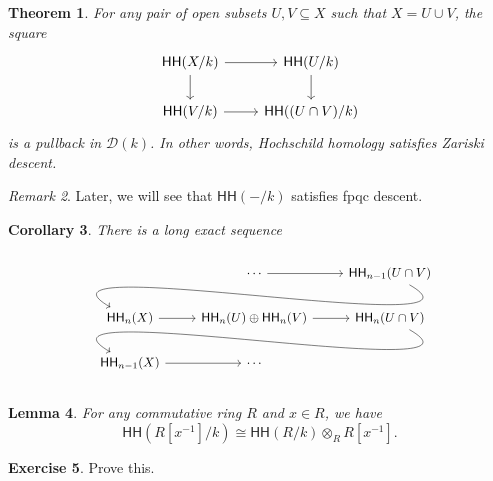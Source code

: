 \documentclass[10pt]{amsart}
\newtheorem{thm}{Theorem}[subsection]
\newtheorem{cor}[thm]{Corollary}
\newtheorem{lem}[thm]{Lemma}
\theoremstyle{definition}
\newtheorem{exer}[thm]{Exercise}
\theoremstyle{remark}
\newtheorem{rmk}[thm]{Remark}
\theoremstyle{plain}
\theoremstyle{definition}
\theoremstyle{remark}
\newcommand{\mc}[1]{\mathcal{#1}}
\newcommand{\ms}[1]{\mathsf{#1}}
\newcommand{\1}{\mathbf{1}}
\newcommand{\2}{\mathbf{2}}
\newcommand{\3}{\mathbf{3}}
\newcommand{\HH}{\ms{HH}}
\begin{document}
\begin{thm}\label{thm:zariskidescent}
    For any pair of open subsets $U, V \subseteq X$ such that $X = U \cup V$, the square
    \begin{equation*}
    \begin{tikzcd}
        \HH(X/k) \ar{r} \ar{d} & \HH(U/k) \ar{d} \\
        \HH(V/k) \ar{r} & \HH((U \cap V)/k)
    \end{tikzcd}
    \end{equation*}
    is a pullback in $\mc{D}(k)$. In other words, Hochschild homology satisfies Zariski descent.
\end{thm}

\begin{rmk}
    Later, we will see that $\HH(-/k)$ satisfies fpqc descent.
\end{rmk}

\begin{cor}
    There is a long exact sequence
    \begin{equation*}
        \begin{tikzcd}
            & \cdots \ar{r} & \HH_{n-1}(U \cap V) \arrow[out=-30, in=150]{dll} \\
            \HH_{n}(X) \ar{r} & \HH_n(U) \oplus \HH_n(V) \ar{r} & \HH_n(U \cap V) \arrow[out=-30,in=150]{dll} \\
            \HH_{n-1}(X) \ar{r} & \cdots
        \end{tikzcd}
    \end{equation*}
\end{cor}

\begin{lem}
    For any commutative ring $R$ and $x \in R$, we have
    \[ \HH(R[x^{-1}]/k) \cong \HH(R/k) \otimes_R R[x^{-1}]. \]
\end{lem}

\begin{exer}
    Prove this.
\end{exer}
\end{document}
